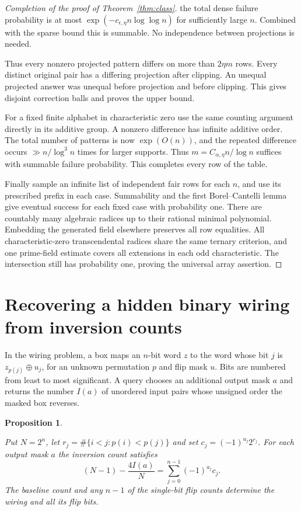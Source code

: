 \documentclass[11pt,letterpaper]{article}
\newtheorem{proposition}[theorem]{Proposition}
\numberwithin{equation}{section}
\begin{document}
\begin{proof}[Completion of the proof of Theorem~\ref{thm:class}]
the total dense failure probability is at most $\exp(-c_{\epsilon,\eta}n\log\log n)$ for
sufficiently large $n$. Combined with the sparse bound this is summable. No independence
between projections is needed.

Thus every nonzero projected pattern differs on more than $2\eta m$ rows. Every distinct
original pair has a differing projection after clipping. An unequal projected answer was
unequal before projection and before clipping. This gives disjoint correction balls and proves
the upper bound.

For a fixed finite alphabet in characteristic zero use the same counting argument directly in
its additive group. A nonzero difference has infinite additive order. The total number of
patterns is now $\exp(O(n))$, and the repeated difference occurs $\gg n/\log^3 n$ times for
larger supports. Thus $m=C_{\alpha,\eta} n/\log n$ suffices with summable failure probability.
This completes every row of the table.

Finally sample an infinite list of independent fair rows for each $n$, and use its prescribed
prefix in each case. Summability and the first Borel--Cantelli lemma give eventual success for
each fixed case with probability one. There are countably many algebraic radices up to their
rational minimal polynomial. Embedding the generated field elsewhere preserves all row
equalities. All characteristic-zero transcendental radices share the same ternary criterion,
and one prime-field estimate covers all extensions in each odd characteristic. The
intersection still has probability one, proving the universal array assertion.
\end{proof}

\section{Recovering a hidden binary wiring from inversion counts}\label{sec:wiring}

In the wiring problem, a box maps an $n$-bit word $z$ to the word whose bit $j$ is
$z_{p(j)}\oplus u_j$, for an unknown permutation $p$ and flip mask $u$. Bits are numbered from
least to most significant. A query chooses an additional output mask $a$ and returns the
number $I(a)$ of unordered input pairs whose unsigned order the masked box reverses.

\begin{proposition}\label{prop:wire}

Put $N=2^n$, let $r_j=\#\{i<j:p(i)<p(j)\}$ and set $c_j=(-1)^{u_j}2^{r_j}$. For each output mask $a$ the inversion count satisfies
\begin{equation}\label{eq:wire}
(N-1)-\frac{4I(a)}{N}=\sum_{j=0}^{n-1}(-1)^{a_j}c_j .
\end{equation}
The baseline count and any $n-1$ of the single-bit flip counts determine the wiring and all its flip bits.
\end{proposition}
\end{document}
